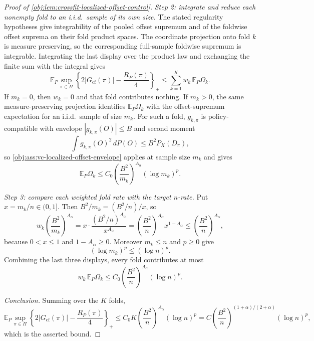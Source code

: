 \begin{proof}[Proof of \cref{obj:lem:crossfit-localized-offset-control}]
\emph{Step 2: integrate and reduce each nonempty fold to an i.i.d.\ sample of its own size.}  The stated regularity hypotheses give integrability of the pooled offset supremum and of the foldwise offset suprema on their fold product spaces.  The coordinate projection onto fold \(k\) is measure preserving, so the corresponding full-sample foldwise supremum is integrable.  Integrating the last display over the product law and exchanging the finite sum with the integral gives
\[
\mathbb E_P\sup_{\pi\in\Pi}\left\{2\left|G_{\mathrm{cf}}(\pi)\right|-\frac{R_P(\pi)}4\right\}_+
\le
\sum_{k=1}^K w_k\,\mathbb E_P\Omega_k .
\]
If \(m_k=0\), then \(w_k=0\) and that fold contributes nothing.  If \(m_k>0\), the same measure-preserving projection identifies \(\mathbb E_P\Omega_k\) with the offset-supremum expectation for an i.i.d.\ sample of size \(m_k\).  For such a fold, \(g_{k,\pi}\) is policy-compatible with envelope \(|g_{k,\pi}(O)|\le B\) and second moment
\[
\int g_{k,\pi}(O)^2\,dP(O)\le B^2P_X(D_\pi),
\]
so \cref{obj:ass:vc-localized-offset-envelope} applies at sample size \(m_k\) and gives
\[
\mathbb E_P\Omega_k
\le
C_0\left(\frac{B^2}{m_k}\right)^{A_\alpha}(\log m_k)^p .
\]

\emph{Step 3: compare each weighted fold rate with the target \(n\)-rate.}  Put \(x=m_k/n\in(0,1]\).  Then \(B^2/m_k=(B^2/n)/x\), so
\[
w_k\left(\frac{B^2}{m_k}\right)^{A_\alpha}
=
x\cdot\frac{(B^2/n)^{A_\alpha}}{x^{A_\alpha}}
=
\left(\frac{B^2}{n}\right)^{A_\alpha}x^{1-A_\alpha}
\le
\left(\frac{B^2}{n}\right)^{A_\alpha},
\]
because \(0<x\le1\) and \(1-A_\alpha\ge0\).  Moreover \(m_k\le n\) and \(p\ge0\) give
\[
(\log m_k)^p\le(\log n)^p .
\]
Combining the last three displays, every fold contributes at most
\[
w_k\,\mathbb E_P\Omega_k
\le
C_0\left(\frac{B^2}{n}\right)^{A_\alpha}(\log n)^p .
\]

\emph{Conclusion.}  Summing over the \(K\) folds,
\[
\mathbb E_P\sup_{\pi\in\Pi}
\left\{2\lvert G_{\mathrm{cf}}(\pi)\rvert-\frac{R_P(\pi)}{4}\right\}_{+}
\le
C_0K\left(\frac{B^2}{n}\right)^{A_\alpha}(\log n)^p
=
C\left(\frac{B^2}{n}\right)^{(1+\alpha)/(2+\alpha)}(\log n)^p ,
\]
which is the asserted bound. %
\end{proof}
